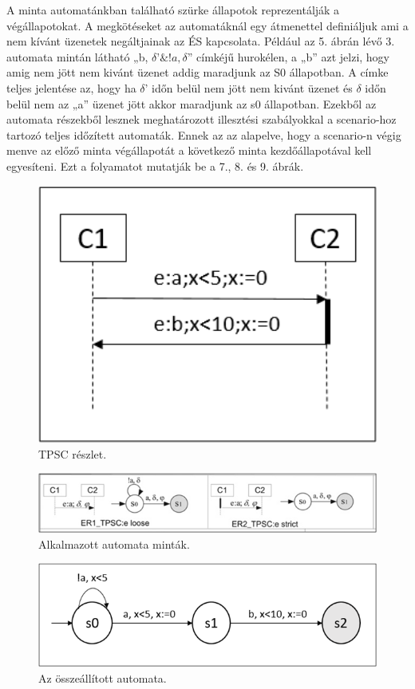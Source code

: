 A minta automatánkban található szürke állapotok reprezentálják a végállapotokat. A megkötéseket az automatáknál egy átmenettel definiáljuk ami a nem kívánt üzenetek negáltjainak az ÉS kapcsolata. Például az 5. ábrán lévő 3. automata mintán látható „b, $\delta ’\&!a, \delta$” címkéjű hurokélen, a „b” azt jelzi, hogy amig nem jött nem kivánt üzenet addig maradjunk az S0 állapotban. A címke teljes jelentése az, hogy ha $\delta$’ időn belül nem jött nem kivánt üzenet és $\delta$ időn belül nem az „a” üzenet jött akkor maradjunk az s0 állapotban. Ezekből az automata részekből lesznek meghatározott illesztési szabályokkal a scenario-hoz tartozó teljes időzített automaták. Ennek az az alapelve, hogy a scenario-n végig menve az előző minta végállapotát a következő minta kezdőállapotával kell egyesíteni. Ezt a folyamatot mutatják be a 7., 8. és 9. ábrák.

\begin{figure}[!ht]
    \centering
    \includegraphics[width=150mm, keepaspectratio]{figures/7abra.png}
    \caption{TPSC részlet.}
\end{figure}

\begin{figure}[!ht]
    \centering
    \includegraphics[width=150mm, keepaspectratio]{figures/8abra.png}
    \caption{Alkalmazott automata minták.}
\end{figure}

\begin{figure}[!ht]
    \centering
    \includegraphics[width=150mm, keepaspectratio]{figures/9abra.png}
    \caption{Az összeállított automata.}
\end{figure}